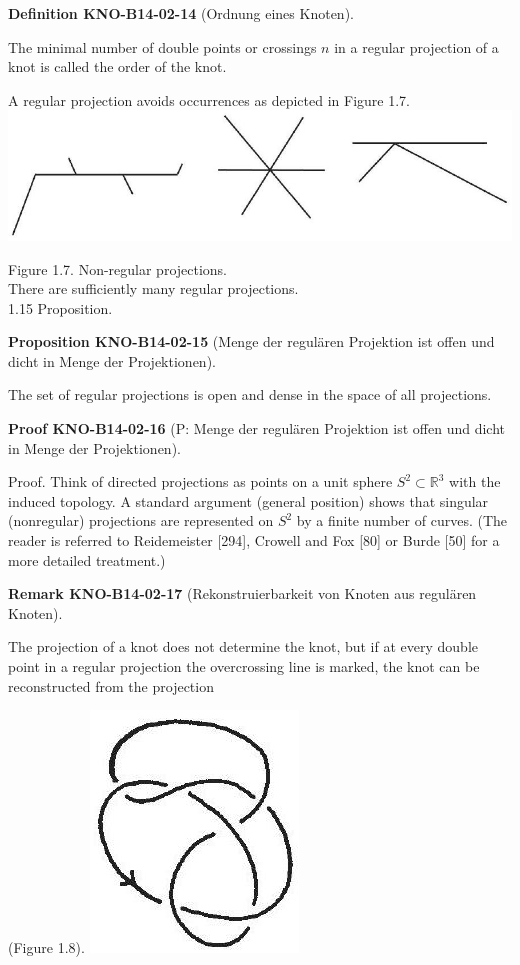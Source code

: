 \documentclass[10pt, letterpaper]{article}
\newcommand{\CustomHeading}[3]{%
  \par\medskip\noindent%
  \textbf{#1 #2} \textnormal{(#3)}.\enskip%
}
\newenvironment{DEF}[2]{\begin{unitbox}\CustomHeading{Definition}{#1}{#2}}{\end{unitbox}}
\newenvironment{PROP}[2]{\begin{unitbox}\CustomHeading{Proposition}{#1}{#2}}{\end{unitbox}}
\newenvironment{REM}[2]{\begin{unitbox}\CustomHeading{Remark}{#1}{#2}}{\end{unitbox}}
\newenvironment{PROOF}[2]{\begin{unitbox}\CustomHeading{Proof}{#1}{#2}}{\end{unitbox}}
\begin{document}
\begin{DEF}{KNO-B14-02-14}{Ordnung eines Knoten}
The minimal number of double points or crossings $n$ in a regular projection of a knot is called the order of the knot.
\end{DEF} 

A regular projection avoids occurrences as depicted in Figure 1.7.\\
\includegraphics[scale=0.2, center]{2025_05_21_9c06be8de7a55410f8c1g-023}

Figure 1.7. Non-regular projections.\\

There are sufficiently many regular projections.\\

1.15 Proposition. 

\begin{PROP}{KNO-B14-02-15}{Menge der regulären Projektion ist offen und dicht in Menge der Projektionen}
The set of regular projections is open and dense in the space of all projections.
\end{PROP}

\begin{PROOF}{KNO-B14-02-16}{P: Menge der regulären Projektion ist offen und dicht in Menge der Projektionen}
Proof. Think of directed projections as points on a unit sphere $S^{2} \subset \mathbb{R}^{3}$ with the induced topology. A standard argument (general position) shows that singular (nonregular) projections are represented on $S^{2}$ by a finite number of curves. (The reader is referred to Reidemeister [294], Crowell and Fox [80] or Burde [50] for a more detailed treatment.)
\end{PROOF}

\begin{REM}{KNO-B14-02-17}{Rekonstruierbarkeit von Knoten aus regulären Knoten}
The projection of a knot does not determine the knot, but if at every double point in a regular projection the overcrossing line is marked, the knot can be reconstructed from the projection
\end{REM} 

(Figure 1.8).
\includegraphics[scale=0.2, center]{2025_05_21_9c06be8de7a55410f8c1g-024}
\end{document}
